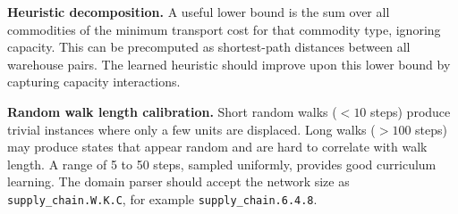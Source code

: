 \documentclass[11pt]{article}
\begin{document}
\textbf{Heuristic decomposition.} A useful lower bound is the sum over all commodities of the minimum transport cost for that commodity type, ignoring capacity. This can be precomputed as shortest-path distances between all warehouse pairs. The learned heuristic should improve upon this lower bound by capturing capacity interactions.

\textbf{Random walk length calibration.} Short random walks ($<10$ steps) produce trivial instances where only a few units are displaced. Long walks ($>100$ steps) may produce states that appear random and are hard to correlate with walk length. A range of 5 to 50 steps, sampled uniformly, provides good curriculum learning. The domain parser should accept the network size as \texttt{supply\_chain.W.K.C}, for example \texttt{supply\_chain.6.4.8}.
\end{document}
